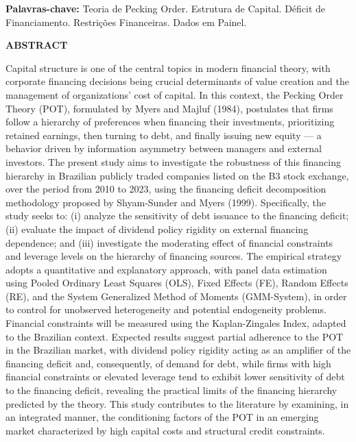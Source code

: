 \documentclass[a4paper,12pt]{article}
\begin{document}
\vspace{0.8cm}
\noindent
\textbf{Palavras-chave:} Teoria de Pecking Order. Estrutura de Capital. Déficit de Financiamento. Restrições Financeiras. Dados em Painel.
 
 
 
\newpage
\begin{center}
    \textbf{ABSTRACT}
\end{center}
 
\noindent
Capital structure is one of the central topics in modern financial theory, with corporate financing decisions being crucial determinants of value creation and the management of organizations' cost of capital. In this context, the Pecking Order Theory (POT), formulated by Myers and Majluf (1984), postulates that firms follow a hierarchy of preferences when financing their investments, prioritizing retained earnings, then turning to debt, and finally issuing new equity — a behavior driven by information asymmetry between managers and external investors. The present study aims to investigate the robustness of this financing hierarchy in Brazilian publicly traded companies listed on the B3 stock exchange, over the period from 2010 to 2023, using the financing deficit decomposition methodology proposed by Shyam-Sunder and Myers (1999). Specifically, the study seeks to: (i) analyze the sensitivity of debt issuance to the financing deficit; (ii) evaluate the impact of dividend policy rigidity on external financing dependence; and (iii) investigate the moderating effect of financial constraints and leverage levels on the hierarchy of financing sources. The empirical strategy adopts a quantitative and explanatory approach, with panel data estimation using Pooled Ordinary Least Squares (OLS), Fixed Effects (FE), Random Effects (RE), and the System Generalized Method of Moments (GMM-System), in order to control for unobserved heterogeneity and potential endogeneity problems. Financial constraints will be measured using the Kaplan-Zingales Index, adapted to the Brazilian context. Expected results suggest partial adherence to the POT in the Brazilian market, with dividend policy rigidity acting as an amplifier of the financing deficit and, consequently, of demand for debt, while firms with high financial constraints or elevated leverage tend to exhibit lower sensitivity of debt to the financing deficit, revealing the practical limits of the financing hierarchy predicted by the theory. This study contributes to the literature by examining, in an integrated manner, the conditioning factors of the POT in an emerging market characterized by high capital costs and structural credit constraints.
 
\end{document}
